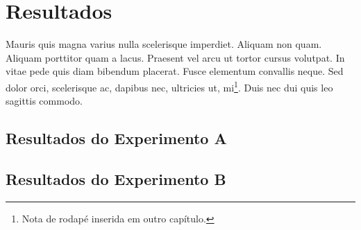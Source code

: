 \chapter{Resultados}
\label{chap:resultados}

\lipsum[2]

Mauris quis magna varius nulla scelerisque imperdiet. Aliquam non quam. Aliquam porttitor quam a lacus. Praesent vel arcu ut tortor cursus volutpat. In vitae pede quis diam bibendum placerat. Fusce elementum convallis neque. Sed dolor orci, scelerisque ac, dapibus nec, ultricies ut, mi\footnote{Nota de rodapé inserida em outro capítulo.}. Duis nec dui quis leo sagittis commodo.

\section{Resultados do Experimento A}
\label{sec:resultados-do-experimento-a}

\lipsum[3]

\section{Resultados do Experimento B}
\label{sec:resultados-do-experimento-b}

\lipsum[4]